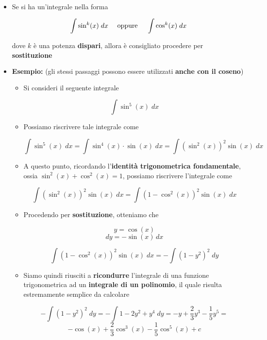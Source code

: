 \documentclass[a4paper, 12pt]{report}
\begin{document}
    \begin{itemize}
        \item Se si ha un'integrale nella forma
        
        \[ \int \sin^k(x) \; dx \text{ \quad oppure \quad} \int \cos^k(x) \; dx\]
        
        dove $k$ è una potenza \textbf{dispari}, allora è consigliato procedere per \textbf{sostituzione}
        
        \item \textbf{Esempio:} (gli stessi passaggi possono essere utilizzati \textbf{anche con il coseno})
        
        \begin{itemize}
            \item Si consideri il seguente integrale
            
            \[ \int \sin^5(x) \; dx\]
            
            \item Possiamo riscrivere tale integrale come
            
            \[\int \sin^5(x) \; dx = \int \sin^4(x) \cdot \sin(x) \; dx = \int (\sin^2(x))^2 \sin(x) \; dx\]
            
            \item A questo punto, ricordando l'\textbf{identità trigonometrica fondamentale}, ossia $\sin^2(x) + \cos^2(x) = 1$, possiamo riscrivere l'integrale come
            
            \[ \int (\sin^2(x))^2  \sin(x) \; dx = \int (1-\cos^2(x))^2 \sin(x) \; dx\]
            
            \item Procedendo per \textbf{sostituzione}, otteniamo che
            
            \[ y=\cos(x)\]
            \[ dy = -\sin(x) \, dx \]
            
            \[ \int (1-\cos^2(x))^2 \sin(x) \; dx = -\int (1-y^2)^2 \; dy \]
            
            \item Siamo quindi riusciti a \textbf{ricondurre} l'integrale di una funzione trigonometrica ad un \textbf{integrale di un polinomio}, il quale risulta estremamente semplice da calcolare
            
            \[ -\int (1-y^2)^2 \; dy =  -\int 1 - 2y^2 + y^4 \; dy = -y + \frac{2}{3}y^3 - \frac{1}{5}y^5 = \]
            \[ -\cos(x)+\frac{2}{3}\cos^3(x)-\frac{1}{5}\cos^5(x)+c\]
        \end{itemize}
        

\end{itemize}
\end{document}
